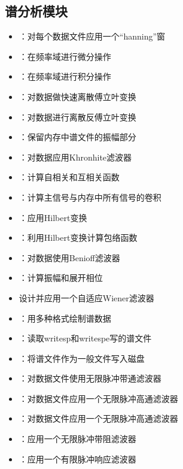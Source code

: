 \subsection*{谱分析模块}
\begin{itemize}
\item {}：对每个数据文件应用一个``hanning''窗
\item {}：在频率域进行微分操作
\item {}：在频率域进行积分操作
\item {}：对数据做快速离散傅立叶变换
\item {}：对数据进行离散反傅立叶变换
\item {}：保留内存中谱文件的振幅部分
\item {}：对数据应用Khronhite滤波器
\item {}：计算自相关和互相关函数
\item {}：计算主信号与内存中所有信号的卷积
\item {}：应用Hilbert变换
\item {}：利用Hilbert变换计算包络函数
\item {}：对数据使用Benioff滤波器
\item {}：计算振幅和展开相位
\item {}设计并应用一个自适应Wiener滤波器
\item {}：用多种格式绘制谱数据
\item {}：读取writesp和writespe写的谱文件
\item {}：将谱文件作为一般文件写入磁盘
\item {}：对数据文件使用无限脉冲带通滤波器
\item {}：对数据文件应用一个无限脉冲高通滤波器
\item {}：对数据文件应用一个无限脉冲高通滤波器
\item {}：应用一个无限脉冲带阻滤波器
\item {}：应用一个有限脉冲响应滤波器
\end{itemize}

